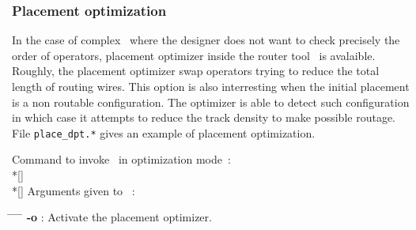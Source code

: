      \subsubsection{Placement optimization}
     \begin{minipage}[t]{\textwidth}
       \forceindent
         In the case of complex \datapath\ where the designer does not want
       to check precisely the order of operators, placement optimizer inside
       the router tool \dpr\ is avalaible. Roughly, the placement
       optimizer swap operators trying to reduce the total length of
       routing wires. This option is also interresting when the initial
       placement is a non routable configuration. The optimizer is able
       to detect such configuration in which case it attempts to reduce
       the track density to make possible routage.\\
       \forceindent
         File {\tt place\_dpt.*} gives an example of placement optimization.
       \bigskip
     \end{minipage}
     \begin{minipage}[t]{\textwidth}
         Command to invoke \dpr\ in optimization mode~:
       \\*[\bigskipamount]
       \forceindent
       \\*[\bigskipamount]
       \forceindent
         Arguments given to \dpr\footnotemark~:
       \begin{tabbing}
         \samepage
         \hspace{\sizeindentation} \= %
         \hspace{0.5cm}      \= %
         \hspace{2cm}        \= %
         \hspace{0.4cm}      \= \kill
         \> {\bf -o} \> \> : \> Activate the placement optimizer.\\
       \end{tabbing}
     \end{minipage}
